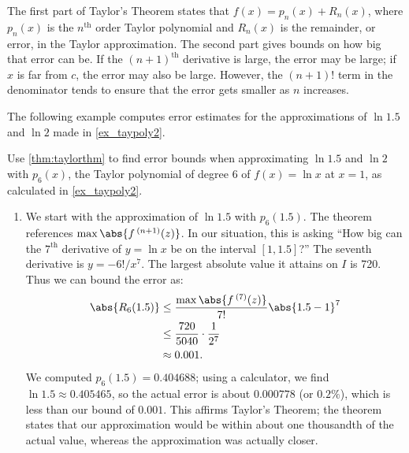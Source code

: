 The first part of Taylor's Theorem states that $f(x) = p_n(x) + R_n(x)$, where $p_n(x)$ is the $n^\text{th}$ order Taylor polynomial and $R_n(x)$ is the remainder, or error, in the Taylor approximation. The second part gives bounds on how big that error can be. If the $(n+1)^\text{th}$ derivative is large, the error may be large; if $x$ is far from $c$, the error may also be large. However, the $(n+1)!$ term in the denominator tends to ensure that the error gets smaller as $n$ increases.

The following example computes error estimates for the approximations of $\ln 1.5$ and $\ln 2$ made in \autoref{ex_taypoly2}.

\begin{example}\label{ex_taypoly3}
Use \autoref{thm:taylorthm} to find error bounds when approximating $\ln 1.5$ and $\ln 2$ with $p_6(x)$, the Taylor polynomial of degree 6 of $f(x)=\ln x$ at $x=1$, as calculated in \autoref{ex_taypoly2}.
\solution
\begin{enumerate}
\item	We start with the approximation of $\ln 1.5$ with $p_6(1.5)$.
%
The theorem references $\max\abs{f\,^{(n+1)}(z)}$. In our situation, this is asking ``How big can the $7^\text{th}$ derivative of $y=\ln x$ be on the interval $[1,1.5]$?'' The seventh derivative is $y = -6!/x^7$. The largest absolute value it attains on $I$ is 720. Thus we can bound the error as:
\begin{align*}
	\abs{R_6(1.5)}
	&\leq \frac{\max\abs{f\,^{(7)}(z)}}{7!}\abs{1.5-1}^7\\
	&\leq \frac{720}{5040}\cdot\frac1{2^7}\\
	&\approx 0.001.
\end{align*}
We computed $p_6(1.5) = 0.404688$; using a calculator, we find $\ln 1.5 \approx 0.405465$, so the actual error is about $0.000778$ (or $0.2\%$), which is less than our bound of $0.001$. This affirms Taylor's Theorem; the theorem states that our approximation would be within about one thousandth of the actual value, whereas the approximation was actually closer.


\end{enumerate}
\end{example}
